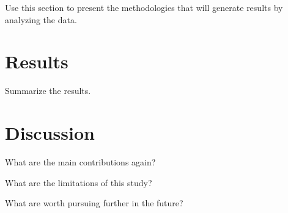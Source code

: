 \documentclass[12pt]{article}
\begin{document}
Use this section to present the methodologies that will generate results by
analyzing the data.


\section{Results}
\label{sec:resu}

Summarize the results.


\section{Discussion}
\label{sec:disc}

What are the main contributions again?

What are the limitations of this study?

What are worth pursuing further in the future?




\end{document}
